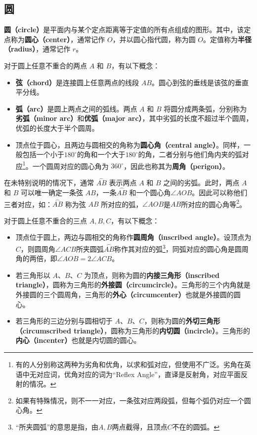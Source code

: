 \subsection{圆}\label{sub_HsGeBa_1}

\textbf{圆（circle）}是平面内与某个定点距离等于定值的所有点组成的图形。其中，该定点称为\textbf{圆心（center）}，通常记作 $O$，并以圆心指代圆，称为圆 $O$。定值称为\textbf{半径（radius）}，通常记作 $r$。

对于圆上任意不重合的两点 $A$ 和 $B$，有以下概念：
\begin{itemize}
\item \textbf{弦（chord）}是连接圆上任意两点的线段 $AB$。圆心到弦的垂线是该弦的垂直平分线。
\item \textbf{弧（arc）}是圆上两点之间的弧线。两点 $A$ 和 $B$ 将圆分成两条弧，分别称为\textbf{劣弧（minor arc）}和\textbf{优弧（major arc）}，其中劣弧的长度不超过半个圆周，优弧的长度大于半个圆周。
\item 顶点位于圆心，且两边与圆相交的角称为\textbf{圆心角（central angle）}。同样，一般包括一个小于$180^\circ$的角和一个大于$180^\circ$的角，二者分别与他们角内夹的弧对应\footnote{有的人分别称这两种为劣角和优角，以求和弧对应，但使用不广泛。劣角在英语中无对应词，优角对应的词为“Reflex Angle”，直译是反射角，对应平面反射的情况。}。一个圆周对应的圆心角为 $360^\circ$，因此也称其为\textbf{周角（perigon）}。
\end{itemize}

在未特别说明的情况下，通常 $\overset{\frown}{AB}$ 表示两点 $A$ 和 $B$ 之间的劣弧。此时，两点 $A$ 和 $B$ 可以唯一确定一条弦 $AB$，一条$\overset{\frown}{AB}$ 和一个圆心角$\angle AOB$。因此可以称他们三者对应，如：$\overset{\frown}{AB}$ 称为弦 $AB$ 所对应的弧，$\angle AOB$是$AB$所对应的圆心角等\footnote{如果有特殊情况，则不一一对应，一条弦对应两段弧，但每个弧仍对应一个圆心角。}。

对于圆上任意不重合的三点 $A,B,C$，有以下概念：
\begin{itemize}
\item 顶点位于圆上，两边与圆相交的角称作\textbf{圆周角（inscribed angle）}。设顶点为$C$，则圆周角$\angle ACB$所夹圆弧$\overset{\frown}{AB}$称作其对应的弧\footnote{“所夹圆弧”的意思是指，由$A,B$两点截得，且顶点$C$不在的圆弧。}，同弧对应的圆心角是圆周角的两倍，即$\angle AOB=2\angle ACB$。
\item 若三角形以 $A$、$B$、$C$ 为顶点，则称为圆的\textbf{内接三角形（inscribed triangle）}，圆称为三角形的\textbf{外接圆（circumcircle）}。三角形的三个内角就是外接圆的三个圆周角，三角形的\textbf{外心（circumcenter）}也就是外接圆的圆心。
\item 若三角形的三边分别与圆相切于 $A$、$B$、$C$，则称为圆的\textbf{外切三角形（circumscribed triangle）}，圆称为三角形的\textbf{内切圆（incircle）}。三角形的\textbf{内心（incenter）}也就是内切圆的圆心。
\end{itemize}

